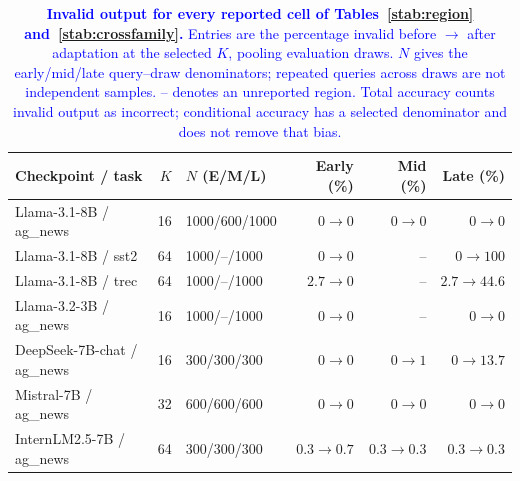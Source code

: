 \begingroup\color{blue}
\begin{table}[t]
\centering
\color{blue}
\caption{\textcolor{blue}{\textbf{Invalid output for every reported cell of Tables~\ref{stab:region} and~\ref{stab:crossfamily}.} Entries are the percentage invalid before $\to$ after adaptation at the selected $K$, pooling evaluation draws. $N$ gives the early/mid/late query--draw denominators; repeated queries across draws are not independent samples. -- denotes an unreported region. Total accuracy counts invalid output as incorrect; conditional accuracy has a selected denominator and does not remove that bias.}}
\label{stab:validity}
\footnotesize\color{blue}
\setlength{\tabcolsep}{4pt}
\begin{tabular}{lrlrrr}
\toprule
Checkpoint / task & $K$ & $N$ (E/M/L) & Early (\%) & Mid (\%) & Late (\%) \\
\midrule
Llama-3.1-8B / ag\_news & 16 & 1000/600/1000 & $0\to 0$ & $0\to 0$ & $0\to 0$ \\
Llama-3.1-8B / sst2 & 64 & 1000/--/1000 & $0\to 0$ & -- & $0\to 100$ \\
Llama-3.1-8B / trec & 64 & 1000/--/1000 & $2.7\to 0$ & -- & $2.7\to 44.6$ \\
Llama-3.2-3B / ag\_news & 16 & 1000/--/1000 & $0\to 0$ & -- & $0\to 0$ \\
DeepSeek-7B-chat / ag\_news & 16 & 300/300/300 & $0\to 0$ & $0\to 1$ & $0\to 13.7$ \\
Mistral-7B / ag\_news & 32 & 600/600/600 & $0\to 0$ & $0\to 0$ & $0\to 0$ \\
InternLM2.5-7B / ag\_news & 64 & 300/300/300 & $0.3\to 0.7$ & $0.3\to 0.3$ & $0.3\to 0.3$ \\
\bottomrule
\end{tabular}
\end{table}
\endgroup

